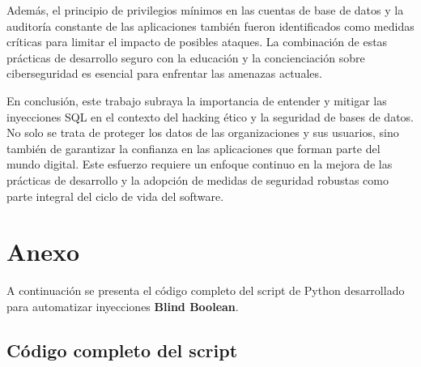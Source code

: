 \documentclass[a4paper,12pt]{article}
\begin{document}
\vspace{0,5cm}



Además, el principio de privilegios mínimos en las cuentas de base de datos y la auditoría constante de las aplicaciones también fueron identificados como medidas críticas para limitar el impacto de posibles ataques. La combinación de estas prácticas de desarrollo seguro con la educación y la concienciación sobre ciberseguridad es esencial para enfrentar las amenazas actuales.

\vspace{0,5cm}

En conclusión, este trabajo subraya la importancia de entender y mitigar las inyecciones SQL en el contexto del hacking ético y la seguridad de bases de datos. No solo se trata de proteger los datos de las organizaciones y sus usuarios, sino también de garantizar la confianza en las aplicaciones que forman parte del mundo digital. Este esfuerzo requiere un enfoque continuo en la mejora de las prácticas de desarrollo y la adopción de medidas de seguridad robustas como parte integral del ciclo de vida del software.



\section{Anexo}
\label{sec:anexo}
A continuación se presenta el código completo del script de Python desarrollado para automatizar inyecciones \textbf{Blind Boolean}.

\subsection{Código completo del script}
\end{document}
